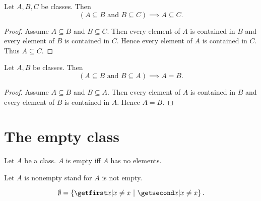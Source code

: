 \documentclass[../../set-theory/set-theory.tex]{subfiles}
\begin{document}
  \begin{forthel}
    \begin{proposition}
      Let $A, B, C$ be classes.
      Then \[ (\text{$A \subseteq B$ and $B \subseteq C$}) \implies
      A \subseteq C. \]
    \end{proposition}
    \begin{proof}
      Assume $A \subseteq B$ and $B \subseteq C$.
      Then every element of $A$ is contained in $B$ and every element of $B$ is
      contained in $C$.
      Hence every element of $A$ is contained in $C$.
      Thus $A \subseteq C$.
    \end{proof}
  \end{forthel}

  \begin{forthel}
    \begin{proposition}
      Let $A, B$ be classes.
      Then \[ (\text{$A \subseteq B$ and $B \subseteq A$}) \implies A = B. \]
    \end{proposition}
    \begin{proof}
      Assume $A \subseteq B$ and $B \subseteq A$.
      Then every element of $A$ is contained in $B$ and every element of $B$ is
      contained in $A$.
      Hence $A = B$.
    \end{proof}
  \end{forthel}


  \section{The empty class}

  \begin{forthel}
    \begin{definition}
      Let $A$ be a class.
      $A$ is empty iff $A$ has no elements.
    \end{definition}

    Let $A$ is nonempty stand for $A$ is not empty.
  \end{forthel}

  \begin{forthel}
    \begin{definition}
      \[ \emptyset = \class{ x | x \neq x }. \]
    \end{definition}
  \end{forthel}
\end{document}
